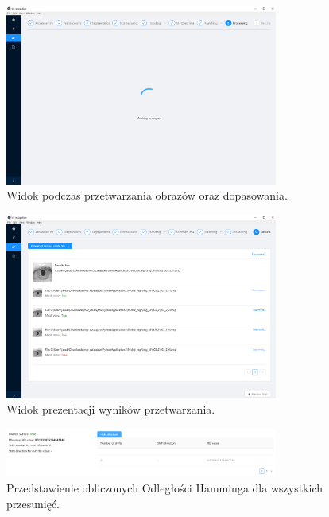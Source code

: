 \begin{figure}[ht]
  \centering
  \includegraphics[width=0.8\textwidth]{images/app/matchingProgress.png}
  \caption{Widok podczas przetwarzania obrazów oraz dopasowania.}
  \label{fig:matchingProcessing}
\end{figure}

\begin{figure}[ht]
  \centering
  \includegraphics[width=0.8\textwidth]{images/app/stepResults.png}
  \caption{Widok prezentacji wyników przetwarzania.}
  \label{fig:stepResultsScreen}
\end{figure}

\begin{figure}[ht]
  \centering
  \includegraphics[width=0.8\textwidth]{images/app/resultsPreviewTable.png}
  \caption{Przedstawienie obliczonych Odległości Hamminga dla wszystkich przesunię\'c.}
  \label{fig:stepResultHDTable}
\end{figure}

